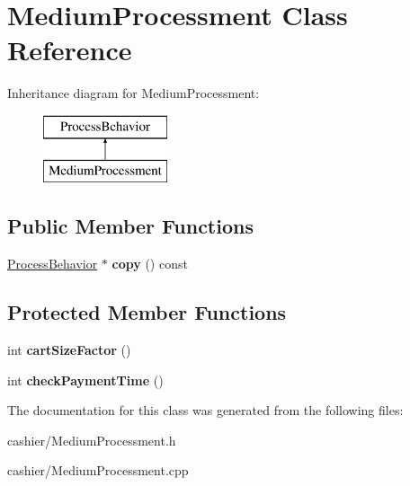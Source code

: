 \hypertarget{classMediumProcessment}{\section{Medium\-Processment Class Reference}
\label{classMediumProcessment}
}
Inheritance diagram for Medium\-Processment\-:\begin{figure}[H]
\begin{center}
\leavevmode
\includegraphics[height=2.000000cm]{classMediumProcessment}
\end{center}
\end{figure}
\subsection*{Public Member Functions}
\begin{DoxyCompactItemize}
\item 
\hypertarget{classMediumProcessment_a8207750eb9bf65f830770b3631845934}{\hyperlink{classProcessBehavior}{Process\-Behavior} $\ast$ {\bfseries copy} () const }\label{classMediumProcessment_a8207750eb9bf65f830770b3631845934}

\end{DoxyCompactItemize}
\subsection*{Protected Member Functions}
\begin{DoxyCompactItemize}
\item 
\hypertarget{classMediumProcessment_a8baac43e0224353f4c5340c5e7117b62}{int {\bfseries cart\-Size\-Factor} ()}\label{classMediumProcessment_a8baac43e0224353f4c5340c5e7117b62}

\item 
\hypertarget{classMediumProcessment_ab14abd8ec6b6a7af6aa2879c471dded7}{int {\bfseries check\-Payment\-Time} ()}\label{classMediumProcessment_ab14abd8ec6b6a7af6aa2879c471dded7}

\end{DoxyCompactItemize}


The documentation for this class was generated from the following files\-:\begin{DoxyCompactItemize}
\item 
cashier/Medium\-Processment.\-h\item 
cashier/Medium\-Processment.\-cpp\end{DoxyCompactItemize}
